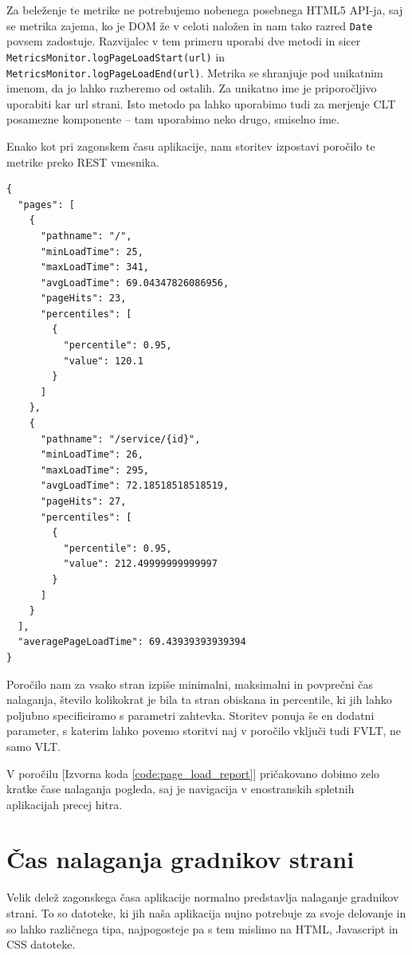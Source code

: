 \documentclass[a4paper, 12pt]{book}
\begin{document}
Za beleženje te metrike ne potrebujemo nobenega posebnega HTML5 API-ja, saj se metrika zajema, ko je DOM že v celoti naložen in nam tako razred \verb|Date| povsem zadostuje. Razvijalec v tem primeru uporabi dve metodi in sicer \verb|MetricsMonitor.logPageLoadStart(url)| in \\ \verb|MetricsMonitor.logPageLoadEnd(url)|. Metrika se shranjuje pod unikatnim imenom, da jo lahko razberemo od ostalih. Za unikatno ime je priporočljivo uporabiti kar url strani. Isto metodo pa lahko uporabimo tudi za merjenje CLT posamezne komponente – tam uporabimo neko drugo, smiselno ime.
 
Enako kot pri zagonskem času aplikacije, nam storitev izpostavi poročilo te metrike preko REST vmesnika.

\begin{lstlisting}[label=code:page_load_report, caption=Poročilo časa nalaganja pogleda]
{
  "pages": [
    {
      "pathname": "/",
      "minLoadTime": 25,
      "maxLoadTime": 341,
      "avgLoadTime": 69.04347826086956,
      "pageHits": 23,
      "percentiles": [
        {
          "percentile": 0.95,
          "value": 120.1
        }
      ]
    },
    {
      "pathname": "/service/{id}",
      "minLoadTime": 26,
      "maxLoadTime": 295,
      "avgLoadTime": 72.18518518518519,
      "pageHits": 27,
      "percentiles": [
        {
          "percentile": 0.95,
          "value": 212.49999999999997
        }
      ]
    }
  ],
  "averagePageLoadTime": 69.43939393939394
}
\end{lstlisting}

Poročilo nam za vsako stran izpiše minimalni, maksimalni in povprečni čas nalaganja, število kolikokrat je bila ta stran obiskana in percentile, ki jih lahko poljubno specificiramo s parametri zahtevka. Storitev ponuja še en dodatni parameter, s katerim lahko povemo storitvi naj v poročilo vključi tudi FVLT, ne samo VLT.

V poročilu [Izvorna koda \ref{code:page_load_report}] pričakovano dobimo zelo kratke čase nalaganja pogleda, saj je navigacija v enostranskih spletnih aplikacijah precej hitra.

\section{Čas nalaganja gradnikov strani}
\label{ch2:sec3}

Velik delež zagonskega časa aplikacije normalno predstavlja nalaganje gradnikov strani. To so datoteke, ki jih naša aplikacija nujno potrebuje za svoje delovanje in so lahko različnega tipa, najpogosteje pa s tem mislimo na HTML, Javascript in CSS datoteke.
\end{document}
